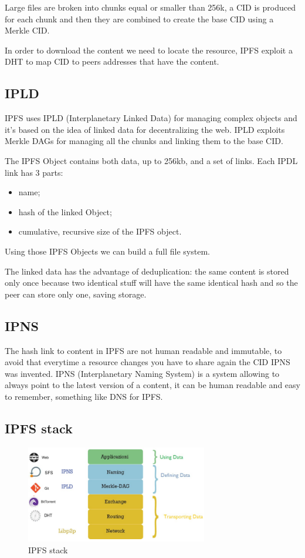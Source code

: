 Large files are broken into chunks equal or smaller than 256k, a CID is produced for each chunk and then they are combined to create the base CID using a Merkle CID.

In order to download the content we need to locate the resource, IPFS exploit a DHT to map CID to peers addresses that have the content.

\subsection{IPLD}
IPFS uses IPLD (Interplanetary Linked Data) for managing complex objects and it's based on the idea of linked data for decentralizing the web.
IPLD exploits Merkle DAGs for managing all the chunks and linking them to the base CID.

The IPFS Object contains both data, up to 256kb, and a set of links.
Each IPDL link has 3 parts:
\begin{itemize}
    \item name;
    \item hash of the linked Object;
    \item cumulative, recursive size of the IPFS object.
\end{itemize}
Using those IPFS Objects we can build a full file system.

The linked data has the advantage of deduplication: the same content is stored only once because two identical stuff will have the same identical hash and so the peer can store only one, saving storage.

\subsection{IPNS}
The hash link to content in IPFS are not human readable and immutable, to avoid that everytime a resource changes you have to share again the CID IPNS was invented.
IPNS (Interplanetary Naming System) is a system allowing to always point to the latest version of a content, it can be human readable and easy to remember, something like DNS for IPFS.

\subsection{IPFS stack}
\begin{figure}[H]
    \centering
    \includegraphics[width=300px]{images/11_IPFS/01.png}
    \caption{IPFS stack}
\end{figure}

